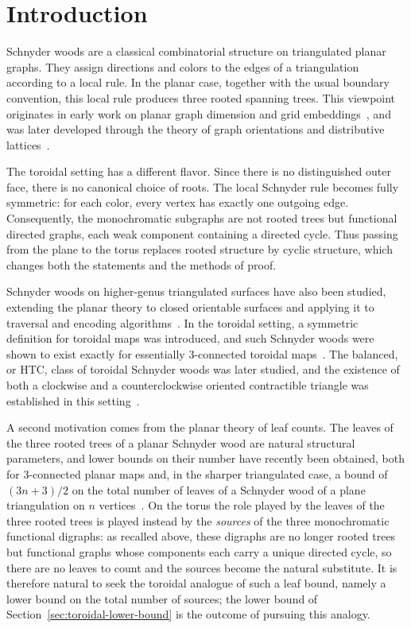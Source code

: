 \documentclass[11pt]{amsart}
\theoremstyle{plain}
\theoremstyle{definition}
\theoremstyle{remark}
\begin{document}
\section{Introduction}
\label{sec:introduction}

Schnyder woods are a classical combinatorial structure on triangulated planar graphs. They assign directions and colors to the edges of a triangulation according to a local rule. In the planar case, together with the usual boundary convention, this local rule produces three rooted spanning trees. This viewpoint originates in early work on planar graph dimension and grid embeddings~\cite{schnyder1989,schnyder1990}, and was later developed through the theory of graph orientations and distributive lattices~\cite{felsner2001,felsner2004}.

The toroidal setting has a different flavor. Since there is no distinguished outer face, there is no canonical choice of roots. The local Schnyder rule becomes fully symmetric: for each color, every vertex has exactly one outgoing edge. Consequently, the monochromatic subgraphs are not rooted trees but functional directed graphs, each weak component containing a directed cycle. Thus passing from the plane to the torus replaces rooted structure by cyclic structure, which changes both the statements and the methods of proof.

Schnyder woods on higher-genus triangulated surfaces have also been studied, extending the planar theory to closed orientable surfaces and applying it to traversal and encoding algorithms~\cite{castelli-fusy-lewiner2009}. In the toroidal setting, a symmetric definition for toroidal maps was introduced, and such Schnyder woods were shown to exist exactly for essentially $3$-connected toroidal maps~\cite{goncalves-leveque2014}. The balanced, or HTC, class of toroidal Schnyder woods was later studied, and the existence of both a clockwise and a counterclockwise oriented contractible triangle was established in this setting~\cite{despre-goncalves-leveque2017}.

A second motivation comes from the planar theory of leaf counts. The leaves of the three rooted trees of a planar Schnyder wood are natural structural parameters, and lower bounds on their number have recently been obtained, both for $3$-connected planar maps and, in the sharper triangulated case, a bound of $(3n+3)/2$ on the total number of leaves of a Schnyder wood of a plane triangulation on $n$ vertices~\cite{ortlieb-schmidt}. On the torus the role played by the leaves of the three rooted trees is played instead by the \emph{sources} of the three monochromatic functional digraphs: as recalled above, these digraphs are no longer rooted trees but functional graphs whose components each carry a unique directed cycle, so there are no leaves to count and the sources become the natural substitute. It is therefore natural to seek the toroidal analogue of such a leaf bound, namely a lower bound on the total number of sources; the lower bound of Section~\ref{sec:toroidal-lower-bound} is the outcome of pursuing this analogy.
\end{document}
